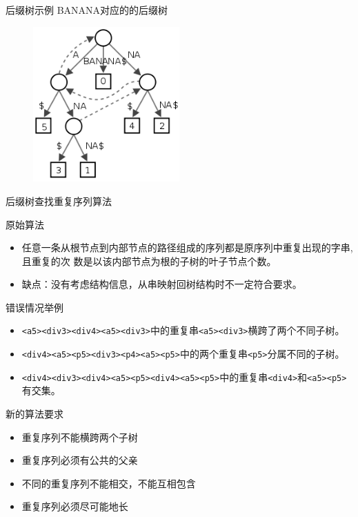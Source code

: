 \begin{frame}[label=sec-2-7]{后缀树示例}
BANANA对应的的后缀树
\begin{figure}[hb]
\centering
\includegraphics[width=0.5\textwidth]{./suffix-tree-banana.png}
\end{figure}
\end{frame}

\begin{frame}[label=sec-2-8]{后缀树查找重复序列算法}
\begin{block}{原始算法}
\begin{itemize}
\item 任意一条从根节点到内部节点的路径组成的序列都是原序列中重复出现的字串,且重复的次
数是以该内部节点为根的子树的叶子节点个数。
\item 缺点：没有考虑结构信息，从串映射回树结构时不一定符合要求。
\end{itemize}
\end{block}
\pause
\begin{block}{错误情况举例}
  \begin{itemize}[<+->]
\item \texttt{<a5><div3><div4><a5><div3>}中的重复串\texttt{<a5><div3>}横跨了两个不同子树。
\item \texttt{<div4><a5><p5><div3><p4><a5><p5>}中的两个重复串\texttt{<p5>}分属不同的子树。
\item \texttt{<div4><div3><div4><a5><p5><div4><a5><p5>}中的重复串\texttt{<div4>}和\texttt{<a5><p5>}有交集\texttt{}。
  \end{itemize}
\end{block}
\end{frame}
\begin{frame} {新的算法要求}
\begin{itemize}
\item 重复序列不能横跨两个子树
\item 重复序列必须有公共的父亲
\item 不同的重复序列不能相交，不能互相包含
\item 重复序列必须尽可能地长
\end{itemize}
\end{frame}

